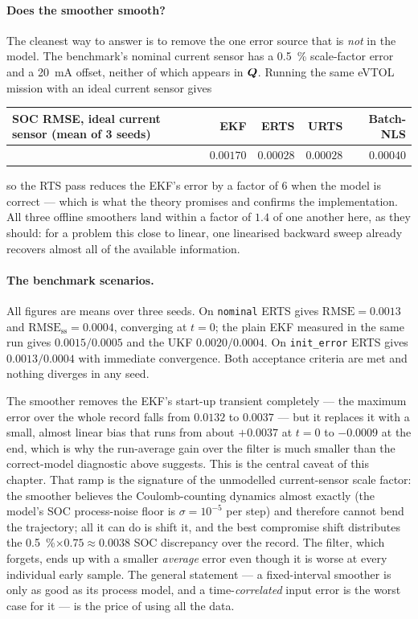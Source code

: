 \paragraph{Does the smoother smooth?}  The cleanest way to answer is to remove the one error source
that is \emph{not} in the model.  The benchmark's nominal current sensor has a \SI{+0.5}{\percent}
scale-factor error and a \SI{20}{\milli\ampere} offset, neither of which appears in $\bm{Q}$.  Running
the same eVTOL mission with an ideal current sensor gives
\begin{center}
\begin{tabular}{@{}lrrrr@{}}
\toprule
SOC RMSE, ideal current sensor (mean of 3 seeds) & EKF & ERTS & URTS & Batch-NLS\\
\midrule
 & $0.00170$ & $\mathbf{0.00028}$ & $0.00028$ & $0.00040$\\
\bottomrule
\end{tabular}
\end{center}
so the RTS pass reduces the EKF's error by a factor of $6$ when the model is correct --- which is
what the theory promises and confirms the implementation.  All three offline smoothers land within a
factor of $1.4$ of one another here, as they should: for a problem this close to linear, one
linearised backward sweep already recovers almost all of the available information.

\paragraph{The benchmark scenarios.}  All figures are means over three seeds.  On \texttt{nominal} ERTS gives $\text{RMSE}=0.0013$ and
$\text{RMSE}_\text{ss}=0.0004$, converging at $t=0$; the plain EKF measured in the same run gives
$0.0015/0.0005$ and the UKF $0.0020/0.0004$.  On \texttt{init\_error} ERTS gives
$0.0013/0.0004$ with immediate convergence.  Both acceptance criteria are met and nothing diverges
in any seed.

The smoother removes the EKF's start-up transient completely --- the maximum error over the whole
record falls from $0.0132$ to $0.0037$ --- but it replaces it with a small, almost linear bias that
runs from about $+0.0037$ at $t=0$ to $-0.0009$ at the end, which is why the run-average gain over
the filter is much smaller than the correct-model diagnostic above suggests.  This is the central
caveat of this chapter.  That ramp is the signature of the
unmodelled current-sensor scale factor: the smoother believes the Coulomb-counting dynamics almost
exactly (the model's SOC process-noise floor is $\sigma=10^{-5}$ per step) and therefore cannot bend
the trajectory; all it can do is shift it, and the best compromise shift distributes the
\SI{0.5}{\percent}$\times0.75\approx0.0038$ SOC discrepancy over the record.  The filter, which
forgets, ends up with a smaller \emph{average} error even though it is worse at every individual
early sample.  The general statement --- a fixed-interval smoother is only as good as its process
model, and a time-\emph{correlated} input error is the worst case for it --- is the price of using
all the data.

